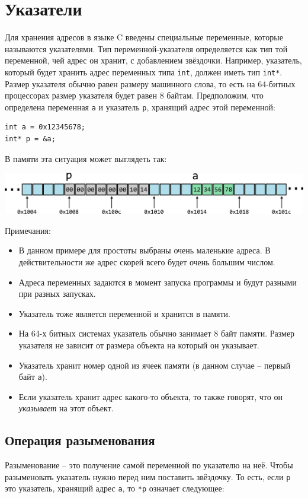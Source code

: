 \documentclass[10pt]{article}
\begin{document}
\section*{Указатели}
Для хранения адресов в языке C введены специальные переменные, которые называются указателями. Тип переменной-указателя определяется как тип той переменной, чей адрес он хранит, с добавлением звёздочки. Например, указатель, который будет хранить адрес переменных типа \texttt{int}, должен иметь тип \texttt{int*}. Размер указателя обычно равен размеру машинного слова, то есть на 64-битных процессорах размер указателя будет равен 8 байтам.
Предположим, что определена переменная \texttt{a} и указатель \texttt{p}, хранящий адрес этой переменной:
\begin{lstlisting}
int a = 0x12345678;
int* p = &a;
\end{lstlisting}
В памяти эта ситуация может выглядеть так:
\begin{center}
\includegraphics[scale=1]{../images/memory_3_pointer_to_int_b.png}
\end{center}
Примечания:
\begin{itemize}
\item В данном примере для простоты выбраны очень маленькие адреса. В действительности же адрес скорей всего будет очень большим числом.
\item Адреса переменных задаются в момент запуска программы и будут разными при разных запусках.
\item Указатель тоже является переменной и хранится в памяти.
\item На 64-х битных системах указатель обычно занимает 8 байт памяти.
Размер указателя не зависит от размера объекта на который он указывает.
\item Указатель хранит номер одной из ячеек памяти (в данном случае -- первый байт \texttt{a}).
\item Если указатель хранит адрес какого-то объекта, то также говорят, что он \textit{указывает} на этот объект.
\end{itemize}

\subsection*{Операция разыменования}
Разыменование -- это получение самой переменной по указателю на неё. Чтобы разыменовать указатель нужно перед ним поставить звёздочку. То есть, если \texttt{p} это указатель, хранящий адрес \texttt{a}, то \texttt{*p} означает следующее:\\
\end{document}
